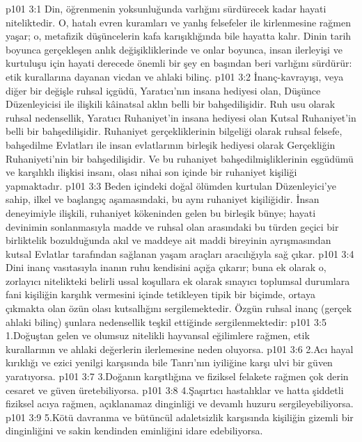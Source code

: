 \vs p101 3:1 Din, öğrenmenin yoksunluğunda varlığını sürdürecek kadar hayati niteliktedir. O, hatalı evren kuramları ve yanlış felsefeler ile kirlenmesine rağmen yaşar; o, metafizik düşüncelerin kafa karışıklığında bile hayatta kalır. Dinin tarih boyunca gerçekleşen anlık değişikliklerinde ve onlar boyunca, insan ilerleyişi ve kurtuluşu için hayati derecede önemli bir şey en başından beri varlığını sürdürür: etik kurallarına dayanan vicdan ve ahlaki bilinç.
\vs p101 3:2 İnanç\hyp{}kavrayışı, veya diğer bir değişle ruhsal içgüdü, Yaratıcı’nın insana hediyesi olan, Düşünce Düzenleyicisi ile ilişkili kâinatsal aklın belli bir bahşedilişidir. Ruh usu olarak ruhsal nedensellik, Yaratıcı Ruhaniyet’in insana hediyesi olan Kutsal Ruhaniyet’in belli bir bahşedilişidir. Ruhaniyet gerçekliklerinin bilgeliği olarak ruhsal felsefe, bahşedilme Evlatları ile insan evlatlarının birleşik hediyesi olarak Gerçekliğin Ruhaniyeti’nin bir bahşedilişidir. Ve bu ruhaniyet bahşedilmişliklerinin eşgüdümü ve karşılıklı ilişkisi insanı, olası nihai son içinde bir ruhaniyet kişiliği yapmaktadır.
\vs p101 3:3 Beden içindeki doğal ölümden kurtulan Düzenleyici’ye sahip, ilkel ve başlangıç aşamasındaki, bu aynı ruhaniyet kişiliğidir. İnsan deneyimiyle ilişkili, ruhaniyet kökeninden gelen bu birleşik bünye; hayati devinimin sonlanmasıyla madde ve ruhsal olan arasındaki bu türden geçici bir birliktelik bozulduğunda akıl ve maddeye ait maddi bireyinin ayrışmasından kutsal Evlatlar tarafından sağlanan yaşam araçları aracılığıyla sağ çıkar.
\vs p101 3:4 Dini inanç vasıtasıyla inanın ruhu kendisini açığa çıkarır; buna ek olarak o, zorlayıcı nitelikteki belirli ussal koşullara ek olarak sınayıcı toplumsal durumlara fani kişiliğin karşılık vermesini içinde tetikleyen tipik bir biçimde, ortaya çıkmakta olan özün olası kutsallığını sergilemektedir. Özgün ruhsal inanç (gerçek ahlaki bilinç) şunlara nedensellik teşkil ettiğinde sergilenmektedir:
\vs p101 3:5 1.\bibnobreakspace Doğuştan gelen ve olumsuz nitelikli hayvansal eğilimlere rağmen, etik kurallarının ve ahlaki değerlerin ilerlemesine neden oluyorsa.
\vs p101 3:6 2.\bibnobreakspace Acı hayal kırıklığı ve ezici yenilgi karşısında bile Tanrı’nın iyiliğine karşı ulvi bir güven yaratıyorsa.
\vs p101 3:7 3.\bibnobreakspace Doğanın karşıtlığına ve fiziksel felakete rağmen çok derin cesaret ve güven üretebiliyorsa.
\vs p101 3:8 4.\bibnobreakspace Şaşırtıcı hastalıklar ve hatta şiddetli fiziksel acıya rağmen, açıklanamaz dinginliği ve devamlı huzuru sergileyebiliyorsa.
\vs p101 3:9 5.\bibnobreakspace Kötü davranma ve bütüncül adaletsizlik karşısında kişiliğin gizemli bir dinginliğini ve sakin kendinden eminliğini idare edebiliyorsa.

